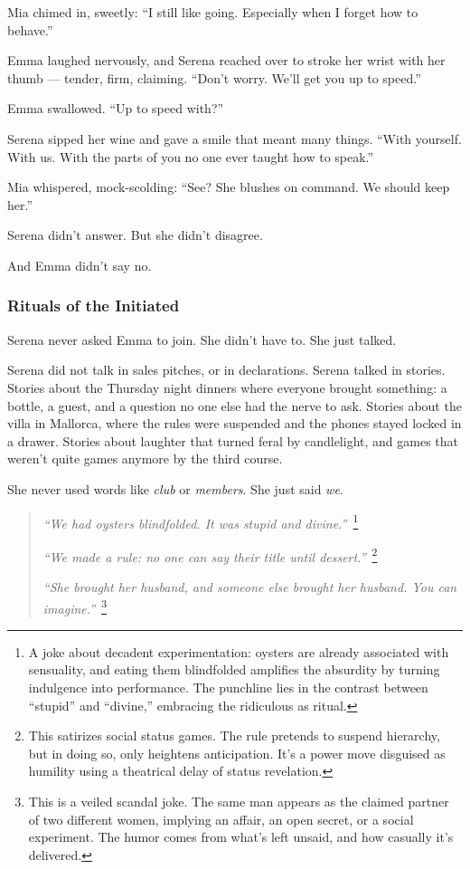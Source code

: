 Mia chimed in, sweetly: ``I still like going. Especially when I forget how to behave.''

Emma laughed nervously, and Serena reached over to stroke her wrist with her thumb — tender, firm, claiming.
``Don’t worry. We’ll get you up to speed.''

Emma swallowed. ``Up to speed with?''

Serena sipped her wine and gave a smile that meant many things.
``With yourself. With us. With the parts of you no one ever taught how to speak.''

Mia whispered, mock-scolding: ``See? She blushes on command. We should keep her.''

Serena didn’t answer. But she didn’t disagree.

And Emma didn’t say no.

\subsubsection{Rituals of the Initiated}

Serena never asked Emma to join.  
She didn’t have to.
She just talked.

Serena did not talk in sales pitches, or in declarations. Serena talked in stories.  
Stories about the Thursday night dinners where everyone brought something: a bottle, a guest, 
and a question no one else had the nerve to ask.  
Stories about the villa in Mallorca, where the rules were suspended and the phones stayed locked in a drawer.  
Stories about laughter that turned feral by candlelight, and games that weren’t quite games anymore by the third course.

She never used words like \textit{club} or \textit{members}.  
She just said \textit{we}.

\begin{quote}
  \textit{``We had oysters blindfolded. It was stupid and divine.''}\ \footnote{A joke about decadent 
  experimentation: oysters are already associated with sensuality, and eating them blindfolded amplifies 
  the absurdity by turning indulgence into performance. The punchline lies in the contrast between 
  “stupid” and “divine,” embracing the ridiculous as ritual.}

  \textit{``We made a rule: no one can say their title until dessert.''}\ \footnote{This satirizes social status 
  games. The rule pretends to suspend hierarchy, but in doing so, only heightens anticipation. It’s a power 
  move disguised as humility using a theatrical delay of status revelation.}

  \textit{``She brought her husband, and someone else brought her husband. You can imagine.''}\ \footnote{This 
  is a veiled scandal joke. The same man appears as the claimed partner of two different women, implying 
  an affair, an open secret, or a social experiment. The humor comes from what’s left unsaid, and 
  how casually it's delivered.}
\end{quote}

